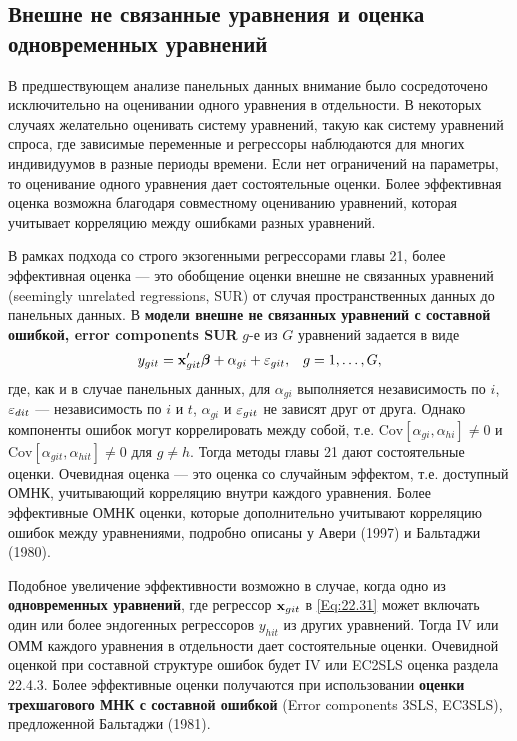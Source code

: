 \subsection{Внешне не связанные уравнения и оценка одновременных уравнений}

В предшествующем анализе панельных данных внимание было сосредоточено исключительно на оценивании одного уравнения в отдельности. В некоторых случаях желательно оценивать систему уравнений, такую как систему уравнений спроса, где зависимые переменные и регрессоры наблюдаются для многих индивидуумов в разные периоды времени. Если нет ограничений на параметры, то оценивание одного уравнения дает состоятельные оценки.  Более эффективная оценка возможна благодаря совместному оцениванию уравнений, которая учитывает корреляцию между ошибками разных уравнений.

В рамках подхода со строго экзогенными регрессорами главы 21, более эффективная оценка --- это обобщение оценки внешне не связанных уравнений (seemingly unrelated regressions, SUR) от случая пространственных данных до панельных данных. В \textbf{модели внешне не связанных уравнений с составной ошибкой, error components SUR}  $g$-е из $G$ уравнений задается в виде
\begin{align}
& y_{git}=\mathbf{x}'_{git}\bm{\beta}+\alpha_{gi}+\varepsilon_{git},
&g=1, \dots, G,
\label{Eq:22.31}
\end{align}
где, как и в случае панельных данных, для $\alpha_{gi}$ выполняется независимость по $i$, $\varepsilon_{dit}$ --- независимость по $i$ и $t$, $\alpha_{gi}$ и $\varepsilon_{git}$ не зависят друг от друга. Однако компоненты ошибок могут коррелировать между собой, т.е. $\mathrm{Cov}[\alpha_{gi},\alpha_{hi}] \neq 0$ и $\mathrm{Cov}[\alpha_{git},\alpha_{hit}] \neq 0$ для $g \neq h$. Тогда методы главы 21 дают состоятельные оценки. Очевидная оценка --- это оценка со случайным эффектом, т.е. доступный ОМНК, учитывающий корреляцию внутри каждого уравнения. Более эффективные ОМНК оценки, которые дополнительно учитывают корреляцию  ошибок между уравнениями, подробно описаны у Авери (1997) и Бальтаджи (1980).

Подобное увеличение эффективности возможно в случае, когда одно из \textbf{одновременных уравнений}, где регрессор $\mathbf{x}_{git}$ в \ref{Eq:22.31} может включать один или более эндогенных регрессоров $y_{hit}$  из других уравнений. Тогда IV или ОММ каждого уравнения в отдельности дает состоятельные оценки. Очевидной оценкой при составной структуре ошибок будет IV или EC2SLS оценка раздела 22.4.3. Более эффективные оценки получаются при использовании \textbf{оценки трехшагового МНК с составной ошибкой} (Error components 3SLS, EC3SLS), предложенной Бальтаджи (1981).


